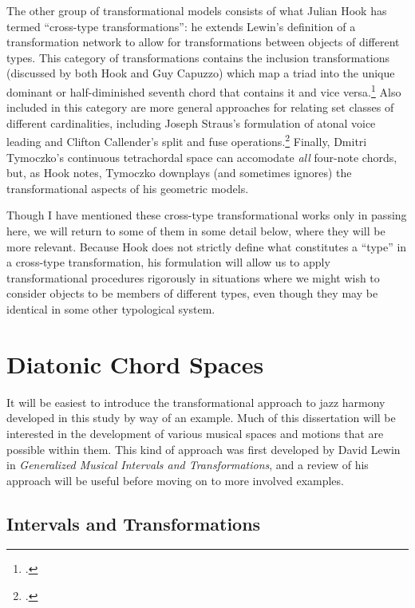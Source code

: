 \documentclass[diss]{subfiles}
\begin{document}
The other group of transformational models consists of what Julian Hook has
termed “cross-type transformations”: he extends Lewin’s definition of a
transformation network to allow for transformations between objects of
different types. This category of transformations contains the
inclusion transformations (discussed by both Hook and Guy Capuzzo) which map a
triad into the unique dominant or half-diminished seventh chord that contains
it and vice versa.\footcites{hook:2002,capuzzo:2004} Also included in this
category are more general approaches for relating set classes of different
cardinalities, including Joseph Straus’s formulation of atonal voice leading
and Clifton Callender’s split and fuse
operations.\footcites{straus:2003,callender:1998} Finally, Dmitri Tymoczko’s
continuous tetrachordal space can accomodate \emph{all} four-note chords, but,
as Hook notes, Tymoczko downplays (and sometimes ignores) the transformational
aspects of his geometric models.


Though I have mentioned these cross-type transformational works only in
passing here, we will return to some of them in some detail below, where they
will be more relevant. Because Hook does not strictly define what constitutes
a “type” in a cross-type transformation, his formulation will allow us to
apply transformational procedures rigorously in situations where we might wish
to consider objects to be members of different types, even though they may be
identical in some other typological system.


\section{Diatonic Chord Spaces}
\label{sec:diatonic-spaces} %

It will be easiest to introduce the transformational approach to jazz harmony
developed in this study by way of an example. Much of this dissertation will
be interested in the development of various musical spaces and motions that
are possible within them. This kind of approach was first developed by David
Lewin in \emph{Generalized Musical Intervals and Transformations}, and a
review of his approach will be useful before moving on to more involved
examples.

\subsection{Intervals and Transformations}
\label{subsec:inttrans} %
\end{document}
